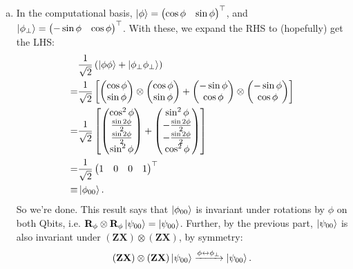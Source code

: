 \documentclass{book}
\theoremstyle{definition}
\newcommand{\nn}{\nonumber}
\newcommand{\X}{\mathbf{X}}
\newcommand{\f}[2]{\frac{#1}{#2}}
\newcommand{\lp}{\left(}
\newcommand{\rp}{\right)}
\newcommand{\lb}{\left[}
\newcommand{\rb}{\right]}
\newcommand{\Z}{\mathbf{Z}}
\begin{document}
\begin{enumerate}[(a)]
	
	\item In the computational basis, $\ket{\phi} = \begin{pmatrix}
	\cos\phi & \sin\phi
	\end{pmatrix}^\top$, and $\ket{\phi_\perp} = \begin{pmatrix}
	-\sin\phi & \cos\phi
	\end{pmatrix}^\top$. With these, we expand the RHS to (hopefully) get the LHS: 
	\begin{align}
	&\f{1}{\sqrt{2}}\lp \ket{\phi\phi} + \ket{\phi_\perp\phi_\perp} \rp\nn\\
	=& \f{1}{\sqrt{2}}\lb \begin{pmatrix}
	\cos\phi \\ \sin\phi
	\end{pmatrix} \otimes \begin{pmatrix}
	\cos\phi \\ \sin\phi
	\end{pmatrix} + \begin{pmatrix}
	-\sin\phi \\ \cos\phi
	\end{pmatrix} \otimes \begin{pmatrix}
	-\sin\phi \\ \cos\phi
	\end{pmatrix} \rb\nn\\
	=& \f{1}{\sqrt{2}}\lb \begin{pmatrix}
	\cos^2\phi \\ \f{\sin 2 \phi}{2} \\ \f{\sin 2\phi}{2} \\ \sin^2\phi \\ 
	\end{pmatrix} + \begin{pmatrix}
	\sin^2\phi \\ -\f{\sin 2 \phi}{2} \\ -\f{\sin 2 \phi}{2} \\ \cos^2\phi
	\end{pmatrix} \rb\nn\\
	=& \f{1}{\sqrt{2}}\begin{pmatrix}
	1 & 0 & 0 & 1
	\end{pmatrix}^\top\nn\\
	\equiv& \ket{\phi_{00}}.
	\end{align}
	So we're done. This result says that $\ket{\phi_{00}}$ is invariant under rotations by $\phi$ on both Qbits, i.e. $\mathbf{R}_\phi\otimes\mathbf{R}_\phi\ket{\psi_{00}}= \ket{\psi_{00}}$. Further, by the previous part, $\ket{\psi_{00}}$ is also invariant under $(\Z\X)\otimes (\Z\X)$, by symmetry:
	\begin{align}
	(\Z \X) \otimes (\Z\X)\ket{\psi_{00}} \xrightarrow{\phi \leftrightarrow \phi_\perp} \ket{\psi_{00}}.
	\end{align}
	

\end{enumerate}
\end{document}
